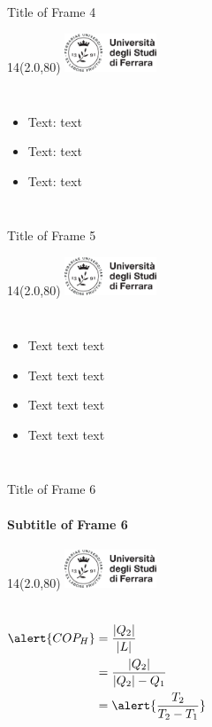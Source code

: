 \documentclass[11pt,xcolor={dvipsnames}]{beamer} %
\DeclarePairedDelimiter{\abs}{\lvert}{\rvert}
\newcommand{\MyLogo}{%
\begin{textblock}{14}(2.0,80)
 \includegraphics[height=1.15cm, angle=0]{logo}
\end{textblock}
}
\begin{document}
\begin{frame}{Title of Frame 4}
\MyLogo
\begin{columns}
	\begin{itemize}
  		\item<1-> Text: \alert{text}
  		\item<2-> Text: \alert{text}
		\item<3-> Text: \alert{text}
  	\end{itemize}
\end{columns}
\end{frame}

\begin{frame}{Title of Frame 5}
\MyLogo
\begin{columns}
	\begin{itemize}
  		\item Text text text
  		\item Text text text
		\item Text text text
		\item Text text text
  	\end{itemize}
\end{columns}
\end{frame}

\begin{frame}{Title of Frame 6}
\framesubtitle{Subtitle of Frame 6}
\MyLogo
\begin{columns}
\begin{align*}
 \alert{COP_H} &= \dfrac{\abs{Q_2}}{\abs{L}} \\
 	   &= \dfrac{\abs{Q_2}}{\abs{Q_2}-Q_1} \\
 	   &= \alert{\dfrac{T_2}{T_2-T_1}} \\
\end{align*}
\end{columns}
\end{frame}

\end{document}
